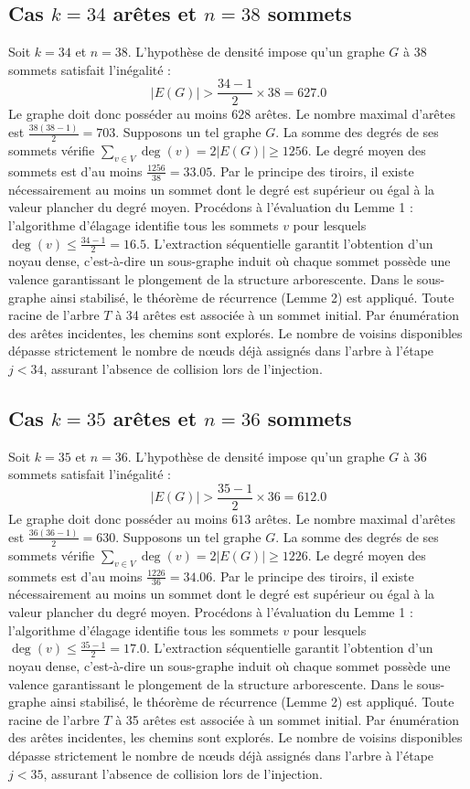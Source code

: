 \documentclass[12pt,a4paper]{article}
\begin{document}
\subsection{Cas $k = 34$ arêtes et $n = 38$ sommets}
Soit $k = 34$ et $n = 38$. L'hypothèse de densité impose qu'un graphe $G$ à 38 sommets satisfait l'inégalité :
$$ |E(G)| > \frac{34-1}{2} \times 38 = 627.0 $$
Le graphe doit donc posséder au moins $628$ arêtes. Le nombre maximal d'arêtes est $\frac{38(38-1)}{2} = 703$.
Supposons un tel graphe $G$. La somme des degrés de ses sommets vérifie $\sum_{v \in V} \deg(v) = 2|E(G)| \geq 1256$.
Le degré moyen des sommets est d'au moins $\frac{1256}{38} = 33.05$.
Par le principe des tiroirs, il existe nécessairement au moins un sommet dont le degré est supérieur ou égal à la valeur plancher du degré moyen.
Procédons à l'évaluation du Lemme 1 : l'algorithme d'élagage identifie tous les sommets $v$ pour lesquels $\deg(v) \leq \frac{34-1}{2} = 16.5$.
L'extraction séquentielle garantit l'obtention d'un noyau dense, c'est-à-dire un sous-graphe induit où chaque sommet possède une valence garantissant le plongement de la structure arborescente.
Dans le sous-graphe ainsi stabilisé, le théorème de récurrence (Lemme 2) est appliqué. Toute racine de l'arbre $T$ à 34 arêtes est associée à un sommet initial. Par énumération des arêtes incidentes, les chemins sont explorés. Le nombre de voisins disponibles dépasse strictement le nombre de nœuds déjà assignés dans l'arbre à l'étape $j < 34$, assurant l'absence de collision lors de l'injection.

\subsection{Cas $k = 35$ arêtes et $n = 36$ sommets}
Soit $k = 35$ et $n = 36$. L'hypothèse de densité impose qu'un graphe $G$ à 36 sommets satisfait l'inégalité :
$$ |E(G)| > \frac{35-1}{2} \times 36 = 612.0 $$
Le graphe doit donc posséder au moins $613$ arêtes. Le nombre maximal d'arêtes est $\frac{36(36-1)}{2} = 630$.
Supposons un tel graphe $G$. La somme des degrés de ses sommets vérifie $\sum_{v \in V} \deg(v) = 2|E(G)| \geq 1226$.
Le degré moyen des sommets est d'au moins $\frac{1226}{36} = 34.06$.
Par le principe des tiroirs, il existe nécessairement au moins un sommet dont le degré est supérieur ou égal à la valeur plancher du degré moyen.
Procédons à l'évaluation du Lemme 1 : l'algorithme d'élagage identifie tous les sommets $v$ pour lesquels $\deg(v) \leq \frac{35-1}{2} = 17.0$.
L'extraction séquentielle garantit l'obtention d'un noyau dense, c'est-à-dire un sous-graphe induit où chaque sommet possède une valence garantissant le plongement de la structure arborescente.
Dans le sous-graphe ainsi stabilisé, le théorème de récurrence (Lemme 2) est appliqué. Toute racine de l'arbre $T$ à 35 arêtes est associée à un sommet initial. Par énumération des arêtes incidentes, les chemins sont explorés. Le nombre de voisins disponibles dépasse strictement le nombre de nœuds déjà assignés dans l'arbre à l'étape $j < 35$, assurant l'absence de collision lors de l'injection.
\end{document}
